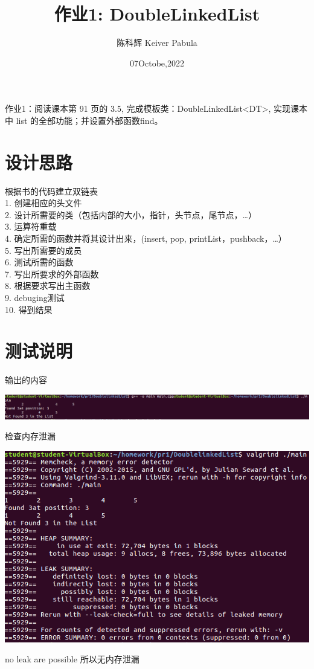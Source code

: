 \documentclass{ctexart}
\title{作业1: DoubleLinkedList}
\author{陈科辉 Keiver Pabula}
\date{07Octobe,2022}
\begin{document}
\maketitle

作业1：阅读课本第 91 页的 3.5, 完成模板类：DoubleLinkedList<DT>, 实现课本中 list 的全部功能；并设置外部函数find。
\section{设计思路}
根据书的代码建立双链表\\
1. 创建相应的头文件\\
2. 设计所需要的类（包括内部的大小，指针，头节点，尾节点，…）\\
3. 运算符重载\\
4. 确定所需的函数并将其设计出来，(insert, pop, printList，pushback，…）\\
5. 写出所需要的成员\\
6. 测试所需的函数\\
7. 写出所要求的外部函数\\
8. 根据要求写出主函数\\
9. debuging测试\\
10. 得到结果\\


\section{测试说明}
输出的内容\\
\begin{center}
  \includegraphics[scale=0.5]{1.png}
\end{center}

检查内存泄漏
\begin{center}
  \includegraphics[scale=0.5]{2.png}
\end{center}
no leak are possible 所以无内存泄漏
\end{document}

